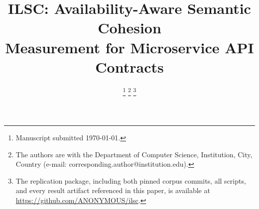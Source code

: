 \documentclass[journal]{IEEEtran}
\begin{document}
\title{ILSC: Availability-Aware Semantic Cohesion\\
       Measurement for Microservice API Contracts}

\author{
  \thanks{Manuscript submitted \today.}
  \thanks{The authors are with the Department of Computer Science,
          Institution, City, Country
          (e-mail: corresponding.author@institution.edu).}
  \thanks{The replication package, including both pinned corpus commits, all
          scripts, and every result artifact referenced in this paper, is
          available at \url{https://github.com/ANONYMOUS/ilsc}.}
}

%

\maketitle
\end{document}
